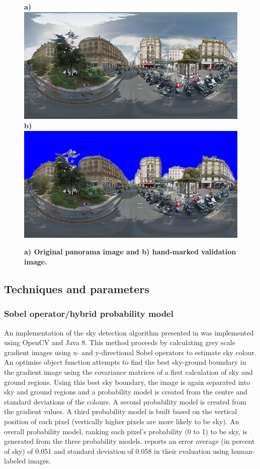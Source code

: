 \documentclass[final,3p,times,authoryear]{elsarticle}
\begin{document}
\begin{figure}
\centering    
\textbf{a)}\includegraphics[scale=0.26]{Images/2/panorama-JtVHmEl7WCiz1xJ0bcJpBg-1.png} 
\textbf{b)}\includegraphics[scale=0.26]{Images/2/panorama-JtVHmEl7WCiz1xJ0bcJpBg-1-marked.png} 

\caption{\bf a) Original panorama image and b) hand-marked validation image.}    
 \label{fig:origmarked}  
\end{figure} 

\subsection{Techniques and parameters}
\subsubsection{\cite{Wang2015a} Sobel operator/hybrid probability model}\label{sec:prob}
An implementation of the sky detection algorithm presented in \cite{Wang2015a} was implemented using OpenCV and Java 8. This method proceeds by calculating grey scale gradient images using x- and y-directional Sobel operators to estimate sky colour. An optimise object function attempts to find the best sky-ground boundary in the gradient image using the covariance matrices of a first calculation of sky and ground regions. Using this best sky boundary, the image is again separated into sky and ground regions and a probability model is created from the centre and standard deviations of the colours. A second probability model is created from the gradient values. A third probability model is built based on the vertical position of each pixel (vertically higher pixels are more likely to be sky). An overall probability model, ranking each pixel's probability (0 to 1) to be sky, is generated from the three probability models. \cite{Wang2015a} reports an error average (in percent of sky) of 0.051 and standard deviation of 0.058 in their evaluation using human-labeled images.  
\end{document}
